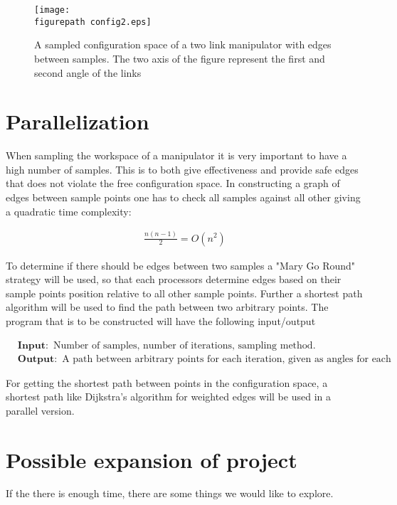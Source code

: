 \begin{figure}[h!] 
 \center 
 \texttt{[image: \\figurepath config2.eps]}
 \caption{ A sampled configuration space of a two link manipulator with edges between samples. The two axis of the figure represent the first and second angle of the links \label{fig:c1}}
 \end{figure}



\section*{Parallelization}
When sampling the workspace of a manipulator it is very important to have a high number of samples. This is to both give effectiveness and provide safe edges that does not violate the free configuration space. In constructing a graph of edges between sample points one has to check all samples against all other giving a quadratic time complexity:

\begin{align}
\label{eq:}
 \frac{n(n-1)}{2}=O(n^2) 
 \end{align}

To determine if there should be edges between two samples a "Mary Go Round" strategy will be used, so that each processors determine edges based on their sample points position relative to all other sample points. Further a shortest path algorithm will be used to find the path between two arbitrary points. 
The program that is to be constructed will have the following input/output

\begin{align}
\label{eq:}
&\mathbf{Input: } \text{ Number of samples, number of iterations, sampling method. } \nonumber \\
 &\mathbf{Output: } \text{ A path between arbitrary points for each iteration, given as angles for each joint in the manipulator.} \nonumber
 \end{align}

For getting the shortest path between points in the configuration space, a shortest path like Dijkstra's algorithm for weighted edges will be used in a parallel version. 

\section*{Possible expansion of project}

If the there is enough time, there are some things we would like to explore. 
















